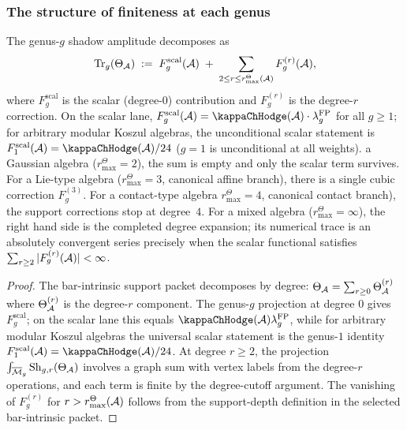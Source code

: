 \subsubsection{The structure of finiteness at each genus}

\begin{proposition}
The genus-$g$ shadow amplitude decomposes as
\begin{equation}%
\operatorname{Tr}_g(\Theta_\cA)
\;:=\;
F_g^{\mathrm{scal}}(\cA)
\;+\;
\sum_{2\le r\le r^\Theta_{\max}(\cA)} F_g^{(r)}(\cA),
\end{equation}
where $F_g^{\mathrm{scal}}$ is the scalar (degree-$0$) contribution and
$F_g^{(r)}$ is the degree-$r$ correction. On the scalar
lane, $F_g^{\mathrm{scal}}(\cA) = \kappaChHodge(\cA) \cdot \lambda_g^{\mathrm{FP}}$ for
all $g \geq 1$; for arbitrary modular Koszul algebras, the
unconditional scalar statement is $F_1^{\mathrm{scal}}(\cA)=\kappaChHodge(\cA)/24$
\textup{(}$g = 1$ is unconditional at all weights\textup{)}. %
a Gaussian algebra (\(r^\Theta_{\max}=2\)), the sum is empty and only the
scalar term survives. For a Lie-type algebra (\(r^\Theta_{\max}=3\), canonical affine branch), there
is a single cubic correction $F_g^{(3)}$. For a contact-type algebra
\(r^\Theta_{\max}=4\), canonical contact branch), the support
corrections stop at degree~$4$. For a mixed
algebra (\(r^\Theta_{\max}=\infty\)), the right hand side is the completed
degree expansion; its numerical trace is an absolutely convergent
series precisely when the scalar functional satisfies
$\sum_{r \geq 2}|F_g^{(r)}(\mathcal{A})|<\infty$.
\end{proposition}

\begin{proof}
The bar-intrinsic support packet decomposes by degree:
$\Theta_{\mathcal{A}} = \sum_{r \geq 0} \Theta_{\mathcal{A}}^{(r)}$ where
$\Theta_{\mathcal{A}}^{(r)}$ is the degree-$r$ component. The genus-$g$
projection at degree $0$ gives $F_g^{\mathrm{scal}}$; on the
scalar lane this equals
$\kappaChHodge(\cA)\lambda_g^{\mathrm{FP}}$, while for arbitrary modular Koszul
algebras the universal scalar statement is the genus-$1$ identity
$F_1^{\mathrm{scal}}(\cA)=\kappaChHodge(\cA)/24$. At degree $r \geq 2$, the projection
$\int_{\overline{\mathcal{M}}_g} \operatorname{Sh}_{g,r}(\Theta_{\mathcal{A}})$
involves a graph sum with vertex labels from the degree-$r$ operations,
and each term is finite by the degree-cutoff argument. The vanishing of
\(F_g^{(r)}\) for \(r>r^\Theta_{\max}(\mathcal{A})\) follows from the
support-depth definition in the selected bar-intrinsic packet.
\end{proof}

